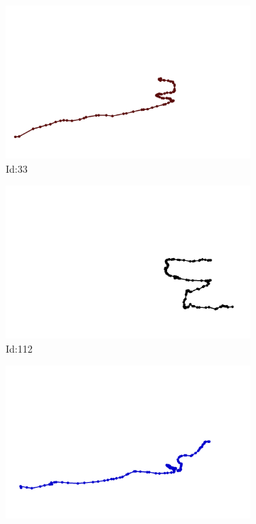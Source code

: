 \documentclass[12pt,twoside]{report}
\begin{document}
\begin{figure}
\centering
\begin{subfigure}[b]{0.20\textwidth}
\centering
\includegraphics[width=\textwidth]{../../trajectories/33.png}
\caption{Id:33}
\end{subfigure}
\begin{subfigure}[b]{0.20\textwidth}
\centering
\includegraphics[width=\textwidth]{../../trajectories/112.png}
\caption{Id:112}
\end{subfigure}
\begin{subfigure}[b]{0.20\textwidth}
\centering
\includegraphics[width=\textwidth]{../../trajectories/511.png}

\end{subfigure}
\end{figure}
\end{document}
